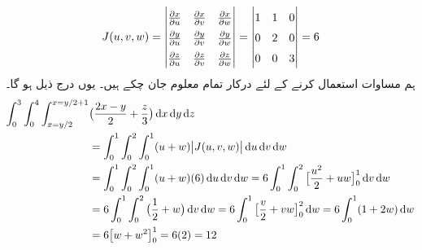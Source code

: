 \begin{align*}
\renewcommand{\arraystretch}{1.5}
J(u,v,w)=\begin{vmatrix}
\frac{\partial x}{\partial u} &\frac{\partial x}{\partial v}&\frac{\partial x}{\partial w}\\
\frac{\partial y}{\partial u}&\frac{\partial y}{\partial v}&\frac{\partial y}{\partial w}\\
\frac{\partial z}{\partial u}&\frac{\partial z}{\partial v}&\frac{\partial z}{\partial w}
\end{vmatrix}=\begin{vmatrix}
1&1&0\\
0&2&0\\
0&0&3
\end{vmatrix}=6
\end{align*}
ہم  مساوات  استعمال کرنے کے لئے درکار تمام معلوم جان چکے ہیں۔ یوں درج ذیل ہو گا۔
\begin{align*}
\int_0^3\int_0^4\int_{x=y/2}^{x=y/2+1}&\big(\frac{2x-y}{2}+\frac{z}{3}\big)\dif x\dif y\dif z\\
&=\int_0^1\int_0^2\int_0^1(u+w)\abs{J(u,v,w)}\dif u\dif v\dif w\\
&=\int_0^1\int_0^2\int_0^1(u+w)(6)\dif u\dif v\dif w=6\int_0^1\int_0^2\big[\frac{u^2}{2}+uw\big]_0^1\dif v\dif w\\
&=6\int_0^1\int_0^2\big(\frac{1}{2}+w\big)\dif v\dif w=6\int_0^1\big[\frac{v}{2}+vw\big]_0^2\dif w=6\int_0^1(1+2w)\dif w\\
&=6\big[w+w^2\big]_0^1=6(2)=12
\end{align*}


